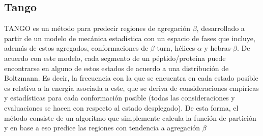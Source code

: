 % 
% 
% 
% 
% 




























\subsection{Tango}\label{tango}


TANGO\cite{fernandez2004prediction} es un método para predecir regiones de agregación $\beta$, desarrollado a partir de un modelo de mecánica estadística con
un espacio de fases que incluye, además de estos agregados, conformaciones de $\beta$-turn, hélices-$\alpha$ y hebras-$\beta$.
De acuerdo con este modelo, cada segmento de un péptido/proteína puede encontrarse en alguno de estos estados de acuerdo a una distribución de Boltzmann. 
Es decir, la frecuencia con la que se encuentra en cada estado posible es relativa a la energía asociada a este, que se deriva de consideraciones empíricas y estadísticas para cada conformación posible
(todas las consideraciones y evaluaciones se hacen con respecto al estado desplegado).
De esta forma, el método consiste de un algoritmo que simplemente calcula la función de partición y en base a eso predice las regiones con tendencia a agregación $\beta$


